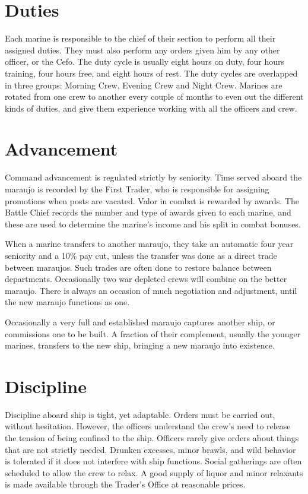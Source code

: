 \begin{multicols*}{2}
\section{Duties}

Each marine is responsible to the chief of their section to perform all their assigned duties. They must also perform any orders given him by any other officer, or the Cefo. The duty cycle is usually eight hours on duty, four hours training, four hours free, and eight hours of rest. The duty cycles are overlapped in three groups: Morning Crew, Evening Crew and Night Crew. Marines are rotated from one crew to another every couple of months to even out the
different kinds of duties, and give them experience working with all the officers and crew.

\section{Advancement}

Command advancement is regulated strictly by seniority. Time served aboard the maraujo is recorded by the First Trader, who is responsible for assigning promotions when posts are vacated.
Valor in combat is rewarded by awards. The Battle Chief records the number and type of awards given to each marine, and these are used to determine the marine’s income and his split in combat bonuses.

When a marine transfers to another maraujo, they take an automatic four year seniority and a 10\% pay cut, unless the transfer was done as a direct trade between maraujos. Such trades are often done to restore balance between departments. Occasionally two war depleted crews will combine on the better maraujo. There is always an occasion of much negotiation and adjustment, until the new maraujo functions as one.

Occasionally a very full and established maraujo captures another ship, or commissions one to be built. A fraction of their complement, usually the younger marines, transfers to the new ship, bringing a new maraujo into existence.

\section{Discipline}

Discipline aboard ship is tight, yet adaptable. Orders must be carried out, without hesitation. However, the officers understand the crew’s need to release the tension of being confined to the ship. Officers rarely give orders about things that are not strictly needed. Drunken excesses, minor brawls, and wild behavior is tolerated if it does not interfere with ship functions. Social gatherings are often scheduled to allow the crew to relax. A good supply of liquor and minor relaxants is made available through the Trader’s Office at reasonable prices.


\end{multicols*}
